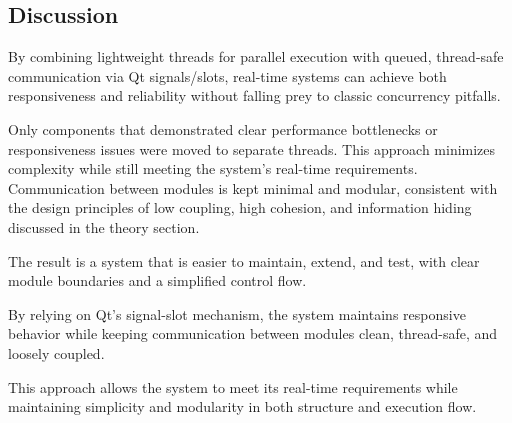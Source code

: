 \subsection{Discussion}


By combining lightweight threads for parallel execution with queued, thread-safe communication via Qt signals/slots, real-time systems can achieve both responsiveness and reliability without falling prey to classic concurrency pitfalls.

Only components that demonstrated clear performance bottlenecks or responsiveness issues were moved to separate threads. This approach minimizes complexity while still meeting the system’s real-time requirements. Communication between modules is kept minimal and modular, consistent with the design principles of low coupling, high cohesion, and information hiding discussed in the theory section.

The result is a system that is easier to maintain, extend, and test, with clear module boundaries and a simplified control flow.

By relying on Qt’s signal-slot mechanism, the system maintains responsive behavior while keeping communication between modules clean, thread-safe, and loosely coupled.

This approach allows the system to meet its real-time requirements while maintaining simplicity and modularity in both structure and execution flow.




